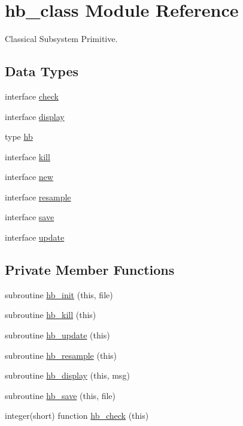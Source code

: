 \hypertarget{classhb__class}{\section{hb\-\_\-class Module Reference}
\label{classhb__class}
}


Classical Subsystem Primitive.  


\subsection*{Data Types}
\begin{DoxyCompactItemize}
\item 
interface \hyperlink{interfacehb__class_1_1check}{check}
\item 
interface \hyperlink{interfacehb__class_1_1display}{display}
\item 
type \hyperlink{structhb__class_1_1hb}{hb}
\item 
interface \hyperlink{interfacehb__class_1_1kill}{kill}
\item 
interface \hyperlink{interfacehb__class_1_1new}{new}
\item 
interface \hyperlink{interfacehb__class_1_1resample}{resample}
\item 
interface \hyperlink{interfacehb__class_1_1save}{save}
\item 
interface \hyperlink{interfacehb__class_1_1update}{update}
\end{DoxyCompactItemize}
\subsection*{Private Member Functions}
\begin{DoxyCompactItemize}
\item 
subroutine \hyperlink{classhb__class_aad89f206670f2c2396f92abf66cf9c1d}{hb\-\_\-init} (this, file)
\item 
subroutine \hyperlink{classhb__class_a696c9e145feab6ab780338ffcf6d6d4b}{hb\-\_\-kill} (this)
\item 
subroutine \hyperlink{classhb__class_a03d6e94665987e6ce2a283953632fb3f}{hb\-\_\-update} (this)
\item 
subroutine \hyperlink{classhb__class_a9d6faaa888c003d629e1b35f8b510832}{hb\-\_\-resample} (this)
\item 
subroutine \hyperlink{classhb__class_a8d8a7109913e9189fbc950d34378727b}{hb\-\_\-display} (this, msg)
\item 
subroutine \hyperlink{classhb__class_a53b39344e155580d8d2161a497774364}{hb\-\_\-save} (this, file)
\item 
integer(short) function \hyperlink{classhb__class_a84c1c4284b5897ff912c8c1671b6775f}{hb\-\_\-check} (this)
\end{DoxyCompactItemize}



